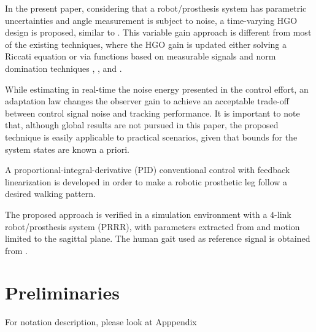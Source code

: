 \documentclass[letterpaper, 10 pt, conference]{ieeeconf}  %
\theoremstyle{plain}
\theoremstyle{definition}
\theoremstyle{remark}
\begin{document}
In the present paper, considering that a robot/prosthesis system has parametric uncertainties and angle measurement is subject to noise, a time-varying HGO design is proposed, similar to \cite{POH:2011}. This variable gain approach is different from most of the existing techniques,
where the HGO gain is updated either solving a Riccati equation \cite{P:01}\cite{P:07}\cite{GAL:06} or via functions based on measurable signals and norm domination techniques \cite{LL:05}, \cite{P:07}, \cite{APA:09} and \cite{POH:2011}.

While estimating in real-time the noise energy presented in the control effort, an adaptation law changes the observer gain to achieve an acceptable trade-off between control signal noise and tracking performance. It is important to note that, although global results are not pursued in this paper, the proposed technique is easily applicable to practical scenarios, given that bounds for the system states are known a priori.

A proportional-integral-derivative (PID) conventional control with feedback linearization is developed in order to make a robotic prosthetic leg follow a desired walking pattern. 

The proposed approach is verified in a simulation environment with a $4$-link robot/prosthesis system (PRRR), with parameters extracted from \cite{Richter2015} and motion limited to the sagittal plane. The human gait used as reference signal is obtained from \cite{Schwartz2008}.


\section{Preliminaries}

For notation description, please look at Apppendix

\end{document}
